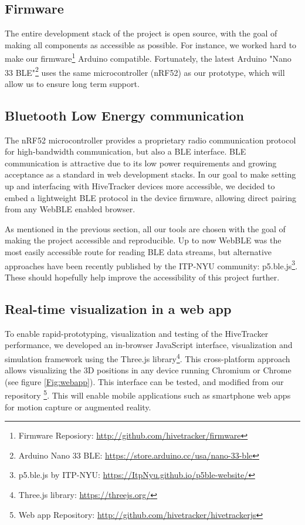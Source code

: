 \documentclass[sigchi]{acmart}
\begin{document}
\subsection{Firmware}

The entire development stack of the project is open source, with the goal of making all components as accessible as possible. For instance, we worked hard to make our firmware\footnote{Firmware Reposiory: \url{http://github.com/hivetracker/firmware}} Arduino compatible. Fortunately, the latest
Arduino "Nano 33 BLE"\footnote{Arduino Nano 33 BLE: \url{https://store.arduino.cc/usa/nano-33-ble}} uses the same microcontroller (nRF52) as our prototype, which will allow us to ensure long term support.

\subsection{Bluetooth Low Energy communication}

The nRF52 microcontroller provides a proprietary radio communication protocol for high-bandwidth communication, but also a BLE interface. BLE communication is attractive due to its low power requirements and growing acceptance as a standard in web development stacks. In our goal to make setting up and interfacing with HiveTracker devices more accessible, we decided to embed a lightweight BLE protocol in the device firmware, allowing direct pairing from any WebBLE enabled browser.

As mentioned in the previous section, all our tools are chosen with the goal of making the project accessible and reproducible. Up to now WebBLE was the most easily accessible route for reading BLE data streams, but alternative approaches have been recently published by the ITP-NYU community: p5.ble.js\footnote{p5.ble.js by ITP-NYU: \url{https://ItpNyu.github.io/p5ble-website/}}. These should hopefully help improve the accessibility of this project further.


\subsection{Real-time visualization in a web app}

To enable rapid-prototyping, visualization and testing of the HiveTracker performance, we developed an in-browser JavaScript interface, visualization and simulation framework using the Three.js library\footnote{Three.js library: \url{https://threejs.org/}}. This cross-platform approach allows visualizing the 3D positions in any device running Chromium or Chrome (see figure \ref{Fig:webapp}). This interface can be tested, and modified from our repository \footnote{Web app Repository: \url{http://github.com/hivetracker/hivetrackerjs}}. This will enable mobile applications such as smartphone web apps for motion capture or augmented reality.
\end{document}
